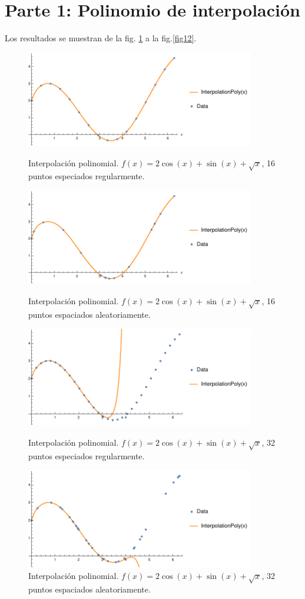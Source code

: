 \documentclass[11pt,letterpaper]{article}
\begin{document}
\section{Parte 1: Polinomio de interpolación}
Los resultados se muestran de la fig. \ref{fig1} a la fig.\ref{fig12}.

\begin{figure} 
\centering
\includegraphics[width=10cm]{img/1.pdf}
\caption{Interpolación polinomial. $f(x)=2\cos (x)+\sin (x)+\sqrt{x}$, 16 puntos especiados regularmente.}
\label{fig1}
\includegraphics[width=10cm]{img/2.pdf}
\caption{Interpolación polinomial. $f(x)=2\cos (x)+\sin (x)+\sqrt{x}$, 16 puntos espaciados aleatoriamente.}
\includegraphics[width=10cm]{img/3.pdf}
\caption{Interpolación polinomial. $f(x)=2\cos (x)+\sin (x)+\sqrt{x}$, 32 puntos especiados regularmente.}
\includegraphics[width=10cm]{img/4.pdf}
\caption{Interpolación polinomial. $f(x)=2\cos (x)+\sin (x)+\sqrt{x}$, 32 puntos espaciados aleatoriamente.}
\end{figure}
\end{document}
